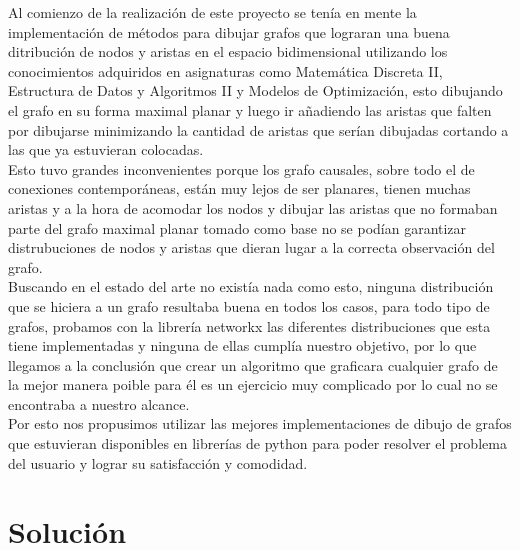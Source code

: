 \documentclass[a4paper,10pt,twocolumn]{article}
\begin{document}
Al comienzo de la realización de este proyecto se tenía en mente la implementación de métodos para dibujar grafos que lograran una buena ditribución de nodos y aristas en el espacio bidimensional utilizando los conocimientos adquiridos en asignaturas como Matemática Discreta II, Estructura de Datos y Algoritmos II y Modelos de Optimización, esto dibujando el grafo en su forma maximal planar y luego ir añadiendo las aristas que falten por dibujarse  minimizando la cantidad de aristas que serían dibujadas cortando a las que ya estuvieran colocadas. \\

Esto tuvo grandes inconvenientes porque los grafo causales, sobre todo el de conexiones contemporáneas, están muy lejos de ser planares, tienen muchas aristas y a la hora de acomodar los nodos y dibujar las aristas que no formaban parte del grafo maximal planar tomado como base no se podían garantizar distrubuciones de nodos y aristas que dieran lugar a la correcta observación del grafo.\\

Buscando en el estado del arte no existía nada como esto, ninguna distribución que se hiciera a un grafo resultaba buena en todos los casos, para todo tipo de grafos, probamos con la librería networkx las diferentes distribuciones que esta tiene implementadas y ninguna de ellas cumplía nuestro objetivo, por lo que llegamos a la conclusión que crear un algoritmo que graficara cualquier grafo de la mejor manera poible para él es un ejercicio muy complicado por lo cual no se encontraba a nuestro alcance.\\

Por esto nos propusimos utilizar las mejores implementaciones de dibujo de grafos que estuvieran disponibles en librerías de python para poder resolver el problema del usuario y lograr su satisfacción y comodidad.\\


\section*{Solución}













\end{document}
